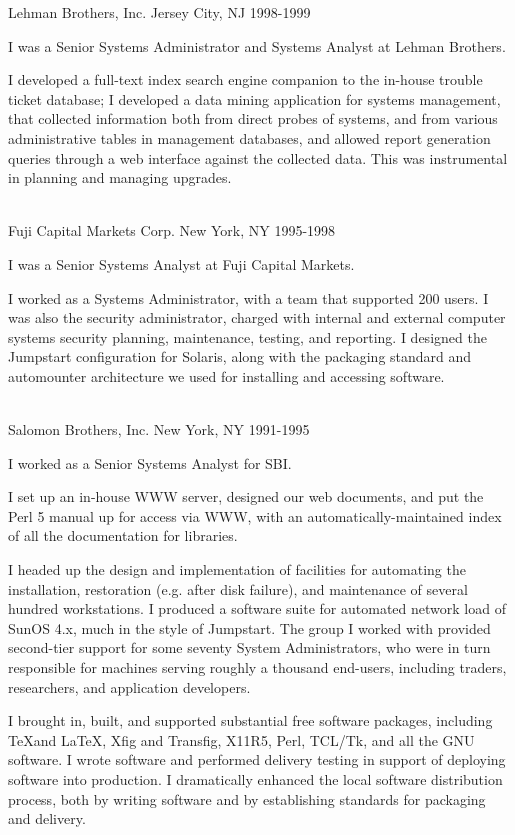 \documentclass[12pt,letterpaper]{article}
\begin{document}
Lehman Brothers, Inc. \hfill Jersey City, NJ
1998-1999

I was a Senior Systems Administrator and Systems Analyst at Lehman
Brothers.

I developed a full-text index search engine companion to the
in-house trouble ticket database; I developed a data mining
application for systems management, that collected information both
from direct probes of systems, and from various administrative
tables in management databases, and allowed report generation
queries through a web interface against the collected data. This was
instrumental in planning and managing upgrades.
\\~

Fuji Capital Markets Corp. \hfill New York, NY
1995-1998

I was a Senior Systems Analyst at Fuji Capital Markets.

I worked as a Systems Administrator, with a team that supported 200
users. I was also the security administrator, charged with internal
and external computer systems security planning, maintenance,
testing, and reporting. I designed the Jumpstart configuration
for Solaris, along with the packaging standard and automounter
architecture we used for installing and accessing software.
\\~

Salomon Brothers, Inc. \hfill New York, NY
1991-1995

I worked as a Senior Systems Analyst for SBI.

I set up an in-house WWW server, designed our web documents,
and put the Perl 5 manual up for access via WWW, with an
automatically-maintained index of all the documentation for
libraries.

I headed up the design and implementation of facilities for
automating the installation, restoration (e.g. after disk failure),
and maintenance of several hundred workstations. I produced a
software suite for automated network load of SunOS 4.x, much in the
style of Jumpstart. The group I worked with provided second-tier
support for some seventy System Administrators, who were in turn
responsible for machines serving roughly a thousand end-users,
including traders, researchers, and application developers.

I brought in, built, and supported substantial free software
packages, including \TeX and \LaTeX, Xfig and Transfig, X11R5, Perl,
TCL/Tk, and all the GNU software. I wrote software and performed
delivery testing in support of deploying software into production. I
dramatically enhanced the local software distribution process, both
by writing software and by establishing standards for packaging and
delivery.
\end{document}
